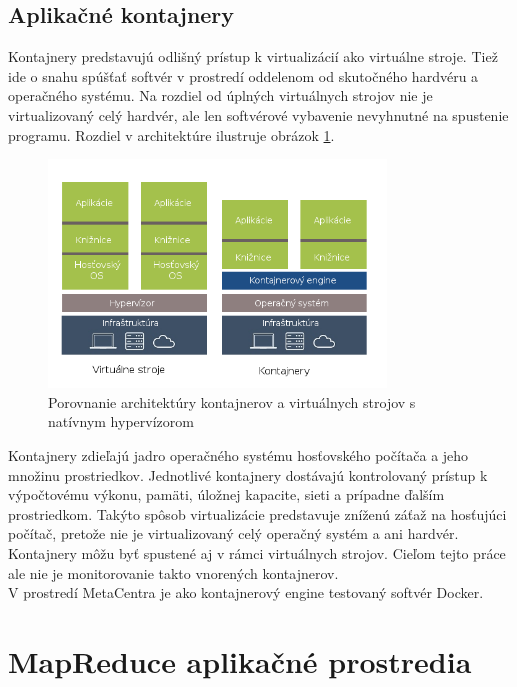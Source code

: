 \documentclass[printed,11pt,twoside,color,cover,table]{fithesis3}
\begin{document}
\subsection{Aplikačné kontajnery}
Kontajnery predstavujú odlišný prístup k virtualizácií ako virtuálne stroje. Tiež ide o snahu spúšťať softvér v prostredí oddelenom od skutočného hardvéru a operačného systému. Na rozdiel od úplných virtuálnych strojov 
nie je virtualizovaný celý hardvér, ale len softvérové vybavenie nevyhnutné na spustenie programu. Rozdiel v architektúre ilustruje obrázok \ref{fig:containers}. 
\begin{figure}
\begin{center}
       \includegraphics[width=0.8\textwidth]{images/kontajnery-virtualky.png}
       \caption{Porovnanie architektúry kontajnerov a virtuálnych strojov s natívnym hypervízorom}
       \label{fig:containers}
\end{center}
\end{figure}
Kontajnery zdieľajú jadro operačného systému hosťovského počítača a jeho množinu prostriedkov. Jednotlivé kontajnery dostávajú kontrolovaný prístup k výpočtovému výkonu, pamäti, úložnej kapacite, 
sieti a prípadne ďalším prostriedkom. Takýto spôsob virtualizácie predstavuje zníženú záťaž na hosťujúci počítač, pretože nie je virtualizovaný celý operačný systém a ani hardvér.
\\Kontajnery môžu byť spustené aj v rámci virtuálnych strojov. Cieľom tejto práce ale nie je monitorovanie takto vnorených kontajnerov.
\\V prostredí MetaCentra je ako kontajnerový engine testovaný softvér Docker\footnotemark{}.
 
\section{MapReduce aplikačné prostredia}
\end{document}
